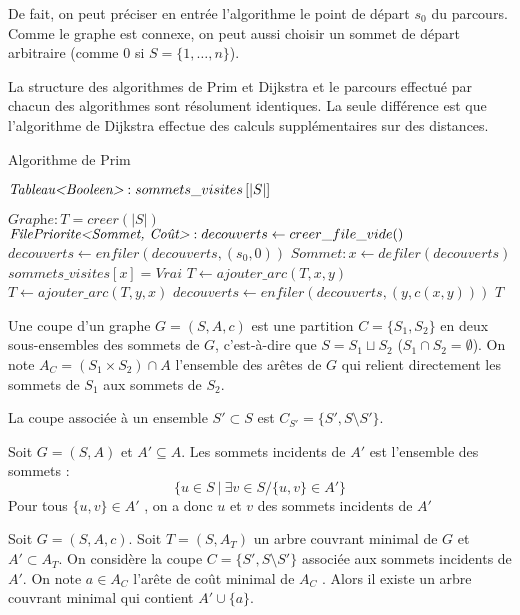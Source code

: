 \documentclass[../../../main.tex]{subfiles}
\begin{document}
De fait, on peut préciser en entrée l'algorithme le point de départ $s_0$ du parcours. Comme le graphe
est connexe, on peut aussi choisir un sommet de départ arbitraire (comme $0$ si $S = \{1, \dots, n\}$).

La structure des algorithmes de Prim et Dijkstra et le parcours effectué par chacun des algorithmes
sont résolument identiques. La seule différence est que l'algorithme de Dijkstra effectue des calculs supplémentaires sur
des distances.

\begin{algorithm}
\caption{Algorithme de Prim\label{alg:prim}}
$\textit{Tableau\textless Booleen\textgreater }:sommets\_visites\left[|S|\right]$\;

$\textit{Graphe}:T = creer(|S|)$\;
$\textit{FilePriorite\textless Sommet, Coût\textgreater }:decouverts\leftarrow creer\_file\_vide()$
$decouverts \leftarrow enfiler(decouverts, (s_0, 0))$\;
 {
	$Sommet:x\leftarrow defiler(decouverts)$
	 {
		$sommets\_visites[x] = \textit{Vrai}$\;
		$T\leftarrow ajouter\_arc(T, x, y)$\;
		$T\leftarrow ajouter\_arc(T, y, x)$\;
		 {
			$decouverts\leftarrow enfiler(decouverts, (y, c(x, y)))$\;
		}
	}
}
\Return $T$\;
\end{algorithm}

 {
	Une coupe d'un graphe $G = (S, A, c)$ est une partition $C = \{S_1, S_2\}$ en deux sous-ensembles
des sommets de $G$, c'est-à-dire que $S = S_1 \sqcup S_2$ ($S_1\cap S_2 = \emptyset$).\newline
On note $A_C = (S_1\times S_2 )\cap A$ l'ensemble des arêtes de $G$ qui relient directement les sommets de
$S_1$ aux sommets de $S_2$.\newline

La coupe associée à un ensemble $S'\subset S$ est $C_{S'} = \{S', S\setminus S'\}$.
}
 {
	Soit $G = (S, A)$ et $A' \subseteq A$. Les sommets incidents de $A'$ est l'ensemble des sommets :
$$\{u \in S\ |\ \exists v \in S/\{u, v\}\in A'\}$$
Pour tous $\{u, v\}\in A'$ , on a donc $u$ et $v$ des sommets incidents de $A'$
}

 Soit $G = (S, A, c)$.
Soit $T = (S, A_T)$ un arbre couvrant minimal de $G$ et $A'\subset A_T$. On considère la coupe $C = \{S', S \setminus S'\}$
associée aux sommets incidents de $A'$. On note $a\in A_C$ l’arête de coût minimal de $A_C$ . Alors il existe
un arbre couvrant minimal qui contient $A'\cup \{a\}$.
\end{document}

